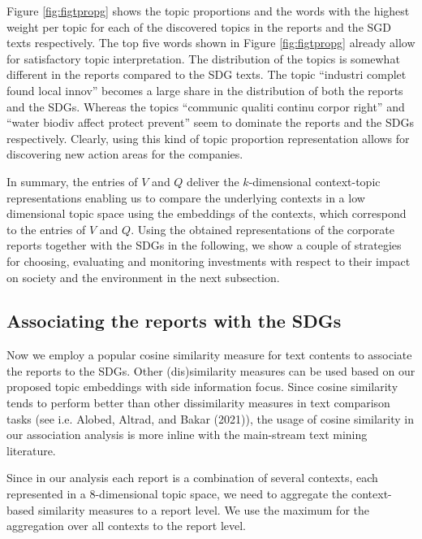 \documentclass[
]{article}
\begin{document}
Figure \ref{fig:figtpropg} shows the topic proportions and the words with the highest weight per topic for each of the discovered topics in the reports and the SGD texts respectively. The top five words shown in Figure \ref{fig:figtpropg} already allow for satisfactory topic interpretation. The distribution of the topics is somewhat different in the reports compared to the SDG texts. The topic ``industri complet found local innov'' becomes a large share in the distribution of both the reports and the SDGs. Whereas the topics ``communic qualiti continu corpor right'' and ``water biodiv affect protect prevent'' seem to dominate the reports and the SDGs respectively. Clearly, using this kind of topic proportion representation allows for discovering new action areas for the companies.

In summary, the entries of \(V\) and \(Q\) deliver the \(k\)-dimensional context-topic representations enabling us to compare the underlying contexts in a low dimensional topic space using the embeddings of the contexts, which correspond to the entries of \(V\) and \(Q\).
Using the obtained representations of the corporate reports together with the SDGs in the following, we show a couple of strategies for choosing, evaluating and monitoring investments with respect to their impact on society and the environment in the next subsection.

\hypertarget{associating-the-reports-with-the-sdgs}{%
\subsection{Associating the reports with the SDGs}\label{associating-the-reports-with-the-sdgs}}

Now we employ a popular cosine similarity measure for text contents to associate the reports to the SDGs. Other (dis)similarity measures can be used based on our proposed topic embeddings with side information focus. Since cosine similarity tends to perform better than other dissimilarity measures in text comparison tasks (see i.e. Alobed, Altrad, and Bakar (2021)), the usage of cosine similarity in our association analysis is more inline with the main-stream text mining literature.

Since in our analysis each report is a combination of several contexts, each represented in a \(8\)-dimensional topic space, we need to aggregate the context-based similarity measures to a report level. We use the maximum for the aggregation over all contexts to the report level.
\end{document}
